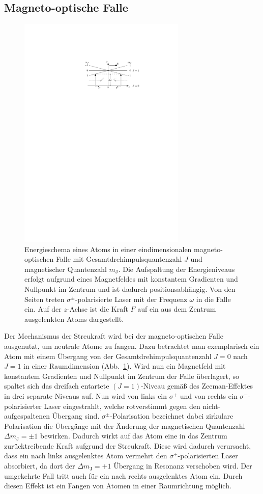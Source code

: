 \documentclass[twocolumn]{revtex4}
\begin{document}
\subsection{Magneto-optische Falle}
\begin{figure}[t]
	\centering
	\vspace{0.5cm}
	\includegraphics[width=80mm]{./figures/mot_gesamt_resize.pdf}
	\caption{Energieschema eines Atoms in einer eindimensionalen magneto-optischen Falle mit Gesamtdrehimpulsquantenzahl $J$ und magnetischer Quantenzahl $m_\mathrm{J}$. Die Aufspaltung der Energieniveaus erfolgt aufgrund eines Magnetfeldes mit konstantem Gradienten und Nullpunkt im Zentrum und ist dadurch positionsabhängig. Von den Seiten treten $\sigma^\pm$-polarisierte Laser mit der Frequenz $\omega$ in die Falle ein. Auf der $z$-Achse ist die Kraft $F$ auf ein aus dem Zentrum ausgelenkten Atoms dargestellt.}
	\label{fig:mot}
	\vspace{-0.5cm}
\end{figure}
Der Mechanismus der Streukraft wird bei der magneto-optischen Falle ausgenutzt, um neutrale Atome zu fangen.
Dazu betrachtet man exemplarisch ein Atom mit einem Übergang von der Gesamtdrehimpulsquantenzahl $J=0$ nach $J=1$ in einer Raumdimension (Abb.~\ref{fig:mot}).
Wird nun ein Magnetfeld mit konstantem Gradienten und Nullpunkt im Zentrum der Falle überlagert, so spaltet sich das dreifach entartete $(J=1)$-Niveau gemäß des Zeeman-Effektes in drei separate Niveaus auf.
Nun wird von links ein $\sigma^+$ und von rechts ein $\sigma^-$-polarisierter Laser eingestrahlt, welche rotverstimmt gegen den nicht-aufgespaltenen Übergang sind.
$\sigma^\pm$-Polarisation bezeichnet dabei zirkulare Polarisation die Übergänge mit der Änderung der magnetischen Quantenzahl $\Delta m_\mathrm{J} = \pm 1$ bewirken.
Dadurch wirkt auf das Atom eine in das Zentrum zurücktreibende Kraft aufgrund der Streukraft.
Diese wird dadurch verursacht, dass ein nach links ausgelenktes Atom vermehrt den $\sigma^+$-polarisierten Laser absorbiert, da dort der $\Delta m_\mathrm{J} = +1$ Übergang in Resonanz verschoben wird. Der umgekehrte Fall tritt auch für ein nach rechts ausgelenktes Atom ein.
Durch diesen Effekt ist ein Fangen von Atomen in einer Raumrichtung möglich.
\end{document}
